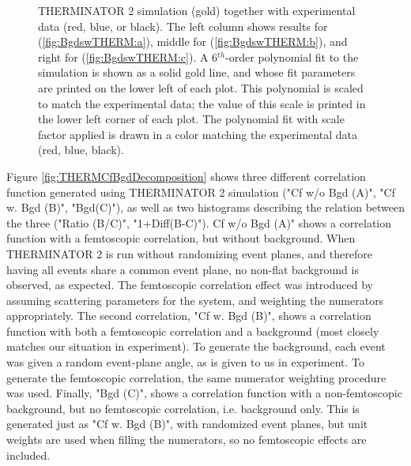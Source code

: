 \documentclass[../AnalysisNoteJBuxton.tex]{subfiles}
\begin{document}
\begin{figure}[h!]
  \caption[Backgrounds with THERMINATOR]{THERMINATOR 2 simulation (gold) together with experimental data (red, blue, or black).  The left column shows results for \LamKchP (\ref{fig:BgdswTHERM:a}), middle for \LamKchM (\ref{fig:BgdswTHERM:b}), and right for \LamKs (\ref{fig:BgdswTHERM:c}).  A 6$^{th}$-order polynomial fit to the simulation is shown as a solid gold line, and whose fit parameters are printed on the lower left of each plot.  This polynomial is scaled to match the experimental data; the value of this scale is printed in the lower left corner of each plot.  The polynomial fit with scale factor applied is drawn in a color matching the experimental data (red, blue, black).}
  \label{fig:BgdswTHERM}
\end{figure}


Figure \ref{fig:THERMCfBgdDecomposition} shows three different correlation function generated using THERMINATOR 2 simulation ("Cf w/o Bgd (A)", "Cf w. Bgd (B)", "Bgd(C)"), as well as two histograms describing the relation between the three ("Ratio (B/C)", "1+Diff(B-C)").  Cf w/o Bgd (A)" shows a correlation function with a femtoscopic correlation, but without background.  When THERMINATOR 2 is run without randomizing event planes, and therefore having all events share a common event plane, no non-flat background is observed, as expected.  The femtoscopic correlation effect was introduced by assuming scattering parameters for the system, and weighting the numerators appropriately.  The second correlation, "Cf w. Bgd (B)", shows a correlation function with both a femtoscopic correlation and a background (most closely matches our situation in experiment).  To generate the background, each event was given a random event-plane angle, as is given to us in experiment.  To generate the femtoscopic correlation, the same numerator weighting procedure was used.  Finally, "Bgd (C)", shows a correlation function with a non-femtoscopic background, but no femtoscopic correlation, i.e. background only.  This is generated just as "Cf w. Bgd (B)", with randomized event planes, but unit weights are used when filling the numerators, so no femtoscopic effects are included.
\end{document}
